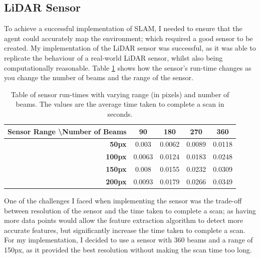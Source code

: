 \documentclass[12pt]{article}
\begin{document}
\subsection{LiDAR Sensor}
To achieve a successful implementation of SLAM, I needed to ensure that the agent could accurately map the environment; which
required a good sensor to be created. My implementation of the LiDAR sensor was successful, as it was able to replicate the
behaviour of a real-world LiDAR sensor, whilst also being computationally reasonable. Table \ref{results_tab} shows how the sensor's
run-time changes as you change the number of beams and the range of the sensor. \\
\begin{table}[H]
    \centering
    \begin{tabular}{|r|c|c|c|c|}
        \hline
        \textbf{Sensor Range \textbackslash Number of Beams} &
        \textbf{90}&
        \textbf{180} &
        \textbf{270} &
        \textbf{360} \\
        \hline
        \textbf{50px} &
        0.003 &
        0.0062 &
        0.0089 &
        0.0118 \\
        \hline
        \textbf{100px} &
        0.0063 &
        0.0124 &
        0.0183 &
        0.0248 \\
        \hline
        \textbf{150px} &
        0.008 &
        0.0155 &
        0.0232 &
        0.0309 \\
        \hline
        \textbf{200px} &
        0.0093 &
        0.0179 &
        0.0266 &
        0.0349 \\
        \hline
    \end{tabular}
    \caption{Table of sensor run-times with varying range (in pixels) and number of beams. The values are the average time taken
    to complete a scan in seconds.}
    \label{results_tab}
\end{table}
One of the challenges I faced when implementing the sensor was the trade-off between resolution of the sensor and the
time taken to complete a scan; as having more data points would allow the feature extraction algorithm to detect more
accurate features, but significantly increase the time taken to complete a scan. For my implementation, I decided to use
a sensor with 360 beams and a range of 150px, as it provided the best resolution without making the scan time too long.\\
\end{document}
